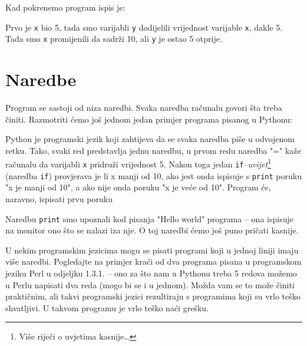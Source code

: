 	Kad pokrenemo program ispis je:


	Prvo je \verb|x| bio 5, tada smo varijabli \verb|y| dodijelili vrijednost varijable
	\verb|x|, dakle 5. Tada smo \verb|x| promijenili da sadr\v zi 10, ali \verb|y| je
	ostao 5 otprije.

\section{Naredbe}

	Program se sastoji od niza naredbi. Svaka naredba ra\v{c}unalu govori \v{s}ta
	treba \v{c}initi. Razmotriti \'{c}emo jo\v{s} jednom jedan primjer programa
	pisanog u Pythonu:
	

	Python je programski jezik koji zahtijeva da se svaka naredba pi\v{s}e u odvojenom
	retku. Tako, svaki red predstavlja jednu naredbu, u prvom redu naredba "=" ka\v{z}e
	ra\v{c}unalu da varijabli \verb|x| pridru\v{z}i vrijednost 5. Nakon toga jedan
	\verb+if+--\emph{uvijet}\footnote{Vi\v{s}e rije\v{c}i o uvjetima kasnije\dots} 
	(naredba \verb+if+)
	provjerava je
	li x manji od 10, ako jest onda ispisuje s \verb+print+ poruku "x je manji od 10", a ako nije onda
	poruku "x je ve\'{c}e od 10". Program \'{c}e, naravno, ispisati prvu poruku

	Naredbu \verb+print+ smo upoznali kod pisanja "Hello world" programa -- ona ispisuje na monitor ono \v{s}to se nalazi iza nje.
	O toj naredbi \'{c}emo jo\v{s} puno pri\v{c}ati kasnije.

	U nekim programskim jezicima mogu se pisati
	programi koji u jednoj liniji imaju vi\v{s}e naredbi. Pogledajte na primjer kra\'{c}i
	od dva programa pisana u programskom jeziku Perl u odjeljku 1.3.1. -- ono za
	\v{s}to nam u Pythonu treba 5 redova mo\v{z}emo u Perlu napisati dva reda (mogo bi
	se i u jednom).
	Mo\v{z}da vam se to mo\v{z}e \v{c}initi prakti\v{c}nim, ali takvi programski jezici
	rezultiraju s programima koji su vrlo te\v{s}ko shvatljivi. U takvom programu je
	vrlo te\v{s}ko na\'{c}i gre\v{s}ku.

